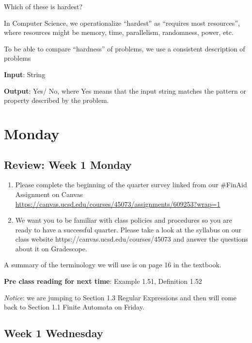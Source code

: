 Which of these is hardest?

\vfill

In Computer Science, we operationalize ``hardest'' as ``requires most resources'', where
resources might be memory, time, parallelism, randomness, power, etc.

To be able to compare ``hardness'' of problems, we use a consistent description of problems

{\bf Input}: String

{\bf Output}: Yes/ No, where Yes means that the input string matches the pattern or property described by the problem.


\newpage
\section*{Monday}


    
\newpage
\subsection*{Review: Week 1 Monday}
\begin{enumerate}
\item Please complete the beginning of the quarter survey linked from our \#FinAid
Assignment on Canvas \href{https://canvas.ucsd.edu/courses/45073/assignments/609253}{https://canvas.ucsd.edu/courses/45073/assignments/609253?wrap=1}
\item We want you to be familiar with class policies and procedures so you are ready to have a successful quarter. 
Please take a look at the syllabus on our class website https://canvas.ucsd.edu/courses/45073
and answer the questions about it on Gradescope.
\end{enumerate}

A summary of the terminology we will use is on page 16 in the textbook.

{\bf Pre class reading for next time}: Example 1.51, Definition 1.52

{\it Notice}: we are jumping to Section 1.3 Regular Expressions and then will come back 
to Section 1.1 Finite Automata on Friday.


\newpage
\subsection*{Week 1 Wednesday}



